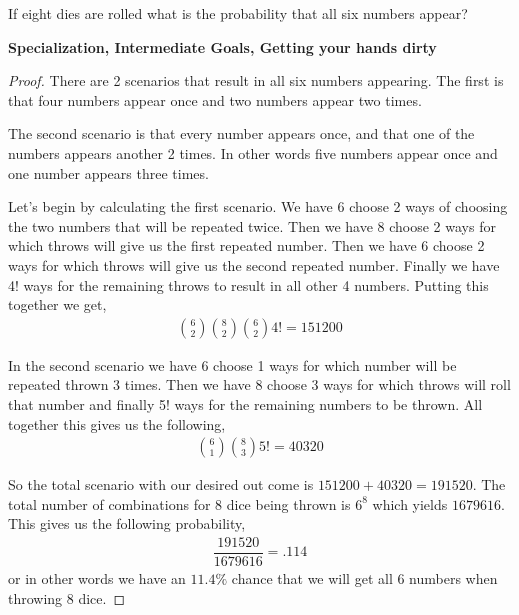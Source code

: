 \documentclass[11pt]{article}
\newenvironment{problem}[2][Problem\!]{\begin{trivlist}
\item[\hskip \labelsep {\bfseries #1}\hskip \labelsep {\bfseries #2}]}{\end{trivlist}}
\begin{document}
\begin{tcolorbox}
    \begin{problem} {IC | 11/03 | 122.}
        If eight dies are rolled what is the probability that all six numbers appear?
    \end{problem}
    \textbf{Specialization, Intermediate Goals, Getting your hands dirty}
\end{tcolorbox}
\begin{proof}
    There are 2 scenarios that result in all six numbers appearing. The first is that four numbers appear once and two numbers appear two times. 

    The second scenario is that every number appears once, and that one of the numbers appears another 2 times. In other words five numbers appear once and one number appears three times. 

    Let's begin by calculating the first scenario. We have 6 choose 2 ways of choosing the two numbers that will be repeated twice. Then we have 8 choose 2 ways for which throws will give us the first repeated number. Then we have 6 choose 2 ways for which throws will give us the second repeated number. Finally we have 4! ways for the remaining throws to result in all other 4 numbers. Putting this together we get,
    \begin{align*}
        \binom{6}{2}\binom{8}{2}\binom{6}{2}4! = 151200 
    \end{align*}

    In the second scenario we have 6 choose 1 ways for which number will be repeated thrown 3 times. Then we have 8 choose 3 ways for which throws will roll that number and finally 5! ways for the remaining numbers to be thrown. All together this gives us the following,
    \begin{align*}
        \binom{6}{1} \binom{8}{3} 5! = 40320
    \end{align*}

    So the total scenario with our desired out come is $151200 + 40320 = 191520$. The total number of combinations for 8 dice being thrown is $6^8$ which yields $1679616$. This gives us the following probability,
    \begin{align*}
        \dfrac{191520}{1679616} = .114
    \end{align*}
    or in other words we have an $11.4\%$ chance that we will get all 6 numbers when throwing 8 dice. 
\end{proof}
\end{document}
